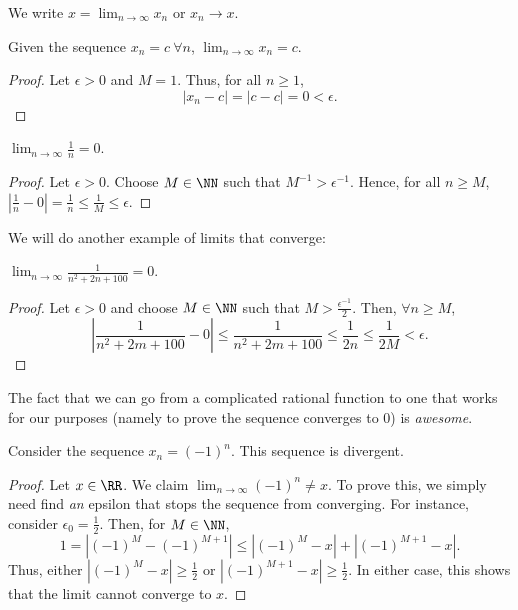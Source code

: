 \begin{notation}
We write $x = \lim_{n\to \infty}x_n$ or $x_n\to x$. 
\end{notation}

\begin{example}
Given the sequence $x_n = c~\forall n$, $\lim_{n\to \infty} x_n = c$.
\end{example}
\begin{proof}
Let $\epsilon>0$ and $M=1$. Thus, for all $n\geq 1$, 
\[
|x_n-c| = |c-c| = 0<\epsilon.
\]
\end{proof}

\begin{example}
$\lim_{n\to \infty} \frac{1}{n} = 0$.
\end{example}
\begin{proof}
Let $\epsilon>0$. Choose $M\in \NN$ such that $M^{-1}>\epsilon^{-1}$. Hence, for all $n\geq M$, $\left|\frac{1}{n} - 0\right| = \frac{1}{n} \leq \frac{1}{M} \leq \epsilon.$
\end{proof}



\noindent We will do another example of limits that converge:
\begin{example}
$\lim_{n\to \infty} \frac{1}{n^2 + 2n + 100}=0.$
\end{example}
\begin{proof}
Let $\epsilon>0$ and choose $M\in \NN$ such that $M> \frac{\epsilon^{-1}}{2}$. Then, $\forall n \geq M$,
\[
\left|\frac{1}{n^2 +2m +100} -0\right| \leq \frac{1}{n^2 +2m +100} \leq \frac{1}{2n} \leq \frac{1}{2M} < \epsilon.
\]
\end{proof}

The fact that we can go from a complicated rational function to one that works for our purposes (namely to prove the sequence converges to 0) is \textit{awesome}. 

\begin{example}
Consider the sequence $x_n = (-1)^n$. This sequence is divergent.
\end{example}
\begin{proof}
Let $x\in \RR$. We claim $\lim_{n\to \infty} (-1)^n \neq x$. To prove this, we simply need find \textit{an} epsilon that stops the sequence from converging. For instance, consider $\epsilon_0 = \frac{1}{2}$. Then, for $M\in \NN$,
\[
1 = |(-1)^M - (-1)^{M+1}| \leq |(-1)^M -x|+|(-1)^{M+1}-x|.
\]
Thus, either $|(-1)^M-x|\geq \frac{1}{2}$ or $|(-1)^{M+1}-x|\geq \frac{1}{2}$. In either case, this shows that the limit cannot converge to $x$.
\end{proof}

